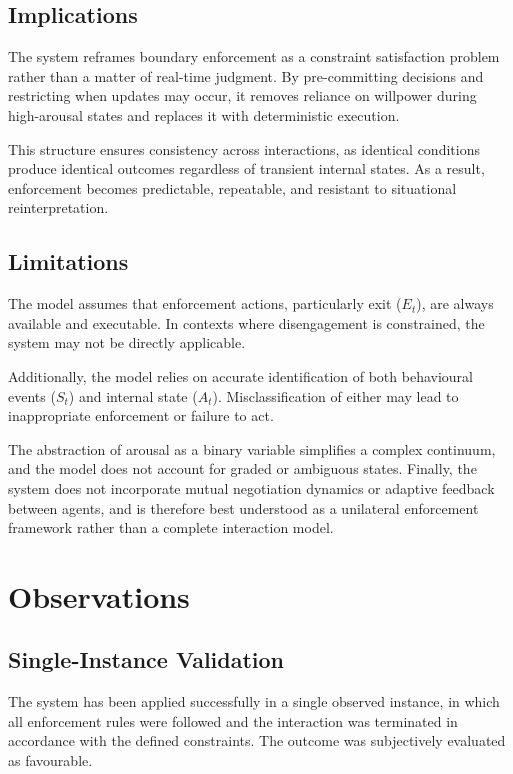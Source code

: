 \documentclass{article}
\begin{document}
	\subsection*{Implications}
	
	The system reframes boundary enforcement as a constraint satisfaction problem rather than a matter of real-time judgment. By pre-committing decisions and restricting when updates may occur, it removes reliance on willpower during high-arousal states and replaces it with deterministic execution.
	
	This structure ensures consistency across interactions, as identical conditions produce identical outcomes regardless of transient internal states. As a result, enforcement becomes predictable, repeatable, and resistant to situational reinterpretation.
	
	\subsection*{Limitations}
	
	The model assumes that enforcement actions, particularly exit ($E_t$), are always available and executable. In contexts where disengagement is constrained, the system may not be directly applicable.
	
	Additionally, the model relies on accurate identification of both behavioural events ($S_t$) and internal state ($A_t$). Misclassification of either may lead to inappropriate enforcement or failure to act.
	
	The abstraction of arousal as a binary variable simplifies a complex continuum, and the model does not account for graded or ambiguous states. Finally, the system does not incorporate mutual negotiation dynamics or adaptive feedback between agents, and is therefore best understood as a unilateral enforcement framework rather than a complete interaction model.
	
	\section*{Observations}
	
	\subsection*{Single-Instance Validation}
	
	The system has been applied successfully in a single observed instance, in which all enforcement rules were followed and the interaction was terminated in accordance with the defined constraints. The outcome was subjectively evaluated as favourable.
	
\end{document}
